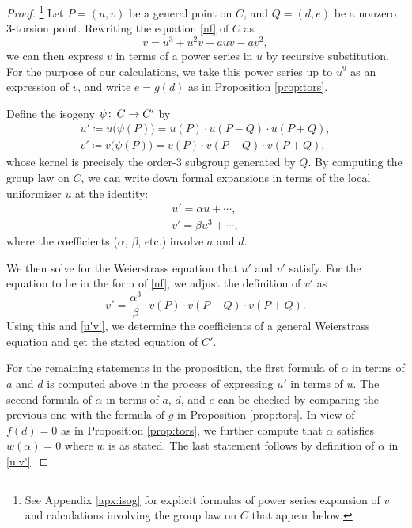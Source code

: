 \documentclass{gtpart}
\theoremstyle{definition}
\theoremstyle{remark}
\def\co{\colon\thinspace}
\newcommand{\A}{\alpha}
\begin{document}
\begin{proof}
 \footnote{See Appendix \ref{apx:isog} for explicit formulas of power series expansion of $v$ and calculations involving the group law on $C$ that appear below.  }
 Let $P = (u,v)$ be a general point on $C$, and $Q = (d,e)$ be a nonzero 3-torsion point.  
 Rewriting the equation \eqref{nf} of $C$ as 
 \[
  v = u^3 + u^2 v - a u v - a v^2, 
 \]
 we can then express $v$ in terms of a power series in $u$ by recursive substitution.  
 For the purpose of our calculations, we take this power series up to $u^9$ as an expression of $v$, 
 and write $e = g(d)$ as in Proposition \ref{prop:tors}.  

 Define the isogeny $\psi \co C \to C'$ by 
 \begin{equation}
 \label{defpsi}
  \begin{array}{l}
   u' \coloneqq u\big(\psi(P)\big) = u(P) \cdot u(P-Q) \cdot u(P+Q), \\
   v' \coloneqq v\big(\psi(P)\big) = v(P) \cdot v(P-Q) \cdot v(P+Q), 
  \end{array}
 \end{equation}
 whose kernel is precisely the order-3 subgroup generated by $Q$.  
 By computing the group law on $C$, we can write down formal expansions in terms of the local uniformizer $u$ at the identity: 
 \begin{equation}
 \label{u'v'}
  \begin{array}{l}
   u' = \A u + \cdots, \\
   v' = \beta u^3 + \cdots, 
  \end{array}
 \end{equation}
 where the coefficients ($\A$, $\beta$, etc.) involve $a$ and $d$.  

 We then solve for the Weierstrass equation that $u'$ and $v'$ satisfy.  
 For the equation to be in the form of \eqref{nf}, we adjust the definition of $v'$ as 
 \[
  v' = \frac{\A^3}{\beta} \cdot v(P) \cdot v(P-Q) \cdot v(P+Q).  
 \]
 Using this and \eqref{u'v'}, we determine the coefficients of a general Weierstrass equation and get the stated equation of $C'$.  
  
 For the remaining statements in the proposition, the first formula of $\A$ in terms of $a$ and $d$ is computed above in the process of expressing $u'$ in terms of $u$.  
 The second formula of $\A$ in terms of $a$, $d$, and $e$ can be checked by comparing the previous one with the formula of $g$ in Proposition \ref{prop:tors}.  
 In view of $f(d) = 0$ as in Proposition \ref{prop:tors}, we further compute that $\A$ satisfies $w(\A) = 0$ where $w$ is as stated.  
 The last statement follows by definition of $\A$ in \eqref{u'v'}.  
\end{proof}
\end{document}
